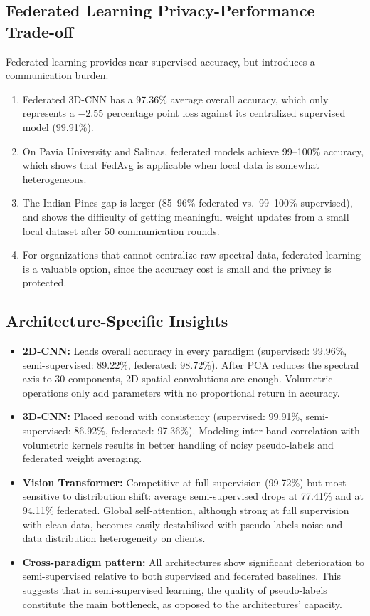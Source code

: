 \subsection{Federated Learning Privacy-Performance Trade-off}
Federated learning provides near-supervised accuracy, but introduces a communication burden.
\begin{enumerate}
    \item Federated 3D-CNN has a 97.36\% average overall accuracy, which only represents a $-2.55$ percentage point loss against its centralized supervised model (99.91\%).
    \item On Pavia University and Salinas, federated models achieve 99--100\% accuracy, which shows that FedAvg is applicable when local data is somewhat heterogeneous.
    \item The Indian Pines gap is larger (85--96\% federated vs.\ 99--100\% supervised), and shows the difficulty of getting meaningful weight updates from a small local dataset after 50 communication rounds.
    \item For organizations that cannot centralize raw spectral data, federated learning is a valuable option, since the accuracy cost is small and the privacy is protected.
\end{enumerate}

\subsection{Architecture-Specific Insights}
\begin{itemize}
    \item \textbf{2D-CNN:} Leads overall accuracy in every paradigm (supervised: 99.96\%, semi-supervised: 89.22\%, federated: 98.72\%). After PCA reduces the spectral axis to 30 components, 2D spatial convolutions are enough. Volumetric operations only add parameters with no proportional return in accuracy.

    \item \textbf{3D-CNN:} Placed second with consistency (supervised: 99.91\%, semi-supervised: 86.92\%, federated: 97.36\%). Modeling inter-band correlation with volumetric kernels results in better handling of noisy pseudo-labels and federated weight averaging.

    \item \textbf{Vision Transformer:} Competitive at full supervision (99.72\%) but most sensitive to distribution shift: average semi-supervised drops at 77.41\% and at 94.11\% federated. Global self-attention, although strong at full supervision with clean data, becomes easily destabilized with pseudo-labels noise and data distribution heterogeneity on clients.

    \item \textbf{Cross-paradigm pattern:} All architectures show significant deterioration to semi-supervised relative to both supervised and federated baselines. This suggests that in semi-supervised learning, the quality of pseudo-labels constitute the main bottleneck, as opposed to the architectures’ capacity.
\end{itemize}

